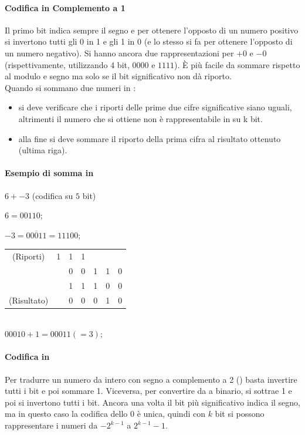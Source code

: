 \documentclass[class=book, crop=false, oneside]{standalone}
\begin{document}
\paragraph*{Codifica in Complemento a 1}
Il primo bit indica sempre il segno e per ottenere l'opposto di un numero positivo si invertono tutti gli 0 in 1 e gli 1 in 0 (e lo stesso si fa per ottenere l’opposto di un numero negativo). Si hanno ancora due rappresentazioni per \(+0\) e \(-0\) (rispettivamente, utilizzando 4 bit, \(0000\) e \(1111\)). È più facile da sommare rispetto al modulo e segno ma solo se il bit significativo non dà riporto.\\
Quando si sommano due numeri in :
\begin{itemize}[noitemsep]
	\item si deve verificare che i riporti delle prime due cifre significative siano uguali, altrimenti il numero che si ottiene non è rappresentabile in  su k bit.
	\item alla fine si deve sommare il riporto della prima cifra al risultato ottenuto (ultima riga).
\end{itemize}
\paragraph*{Esempio di somma in }
\(6+-3\) (codifica su $5$ bit)

\( 6 = 00110; \)

\( -3 = \overline{00011} = 11100; \)\\

\begin{tabular}{ ccccccc }
	(Riporti) & 1 & 1 & 1 & & & \\
	 & & 0 & 0 & 1 & 1 & 0 \\
	 & & 1 & 1 & 1 & 0 & 0 \\\hline
	(Risultato)& & 0 & 0 & 0 & 1 & 0 \\
\end{tabular}\\

\( 00010 + 1 = 00011 (=3); \)

\paragraph*{Codifica in }
Per tradurre un numero da intero con segno a complemento a 2 () basta invertire tutti i bit e poi sommare 1. Viceversa, per convertire da  a binario, si sottrae 1 e poi si invertono tutti i bit. Ancora una volta il bit più significativo indica il segno, ma in questo caso la codifica dello 0 è unica, quindi con \(k\) bit si possono rappresentare i numeri da \(-2^{k-1}\) a \(2^{k-1}-1\).
\end{document}
